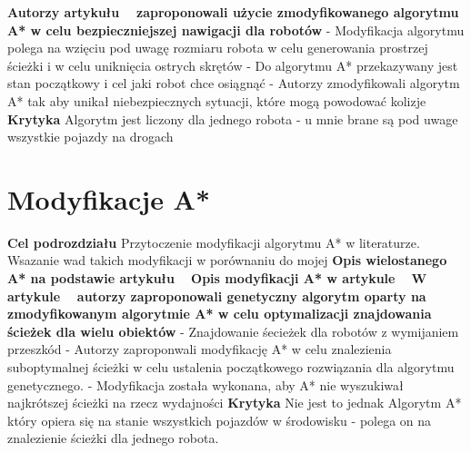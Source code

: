 \newline
\newline
\textbf{Autorzy artykułu ~\cite{elhalawany2013modified} zaproponowali użycie zmodyfikowanego algorytmu A* w celu bezpieczniejszej nawigacji dla robotów}
  \newline
  - Modyfikacja algorytmu polega na wzięciu pod uwagę rozmiaru robota w celu generowania prostrzej ścieżki i w celu uniknięcia ostrych skrętów
  \newline
  - Do algorytmu A* przekazywany jest stan początkowy i cel jaki robot chce osiągnąć
  \newline
  - Autorzy zmodyfikowali algorytm A* tak aby unikał niebezpiecznych sytuacji, które mogą powodować kolizje
\newline
\newline
\textbf{Krytyka}
\newline
 Algorytm jest liczony dla jednego robota - u mnie brane są pod uwage wszystkie pojazdy na drogach
\section{Modyfikacje A*}

\textbf{Cel podrozdziału}
Przytoczenie modyfikacji algorytmu A* w literaturze. Wsazanie wad takich modyfikacji w porównaniu do mojej
\newline
\newline
\textbf{Opis wielostanego A* na podstawie artykułu ~\cite{wojnicki2015robust} }
\newline
\newline
\textbf{Opis modyfikacji A* w artykule ~\cite{munteanmobile}}
\newline
\newline
\textbf{W artykule ~\cite{oleiwi2014modified} autorzy zaproponowali genetyczny algorytm oparty na zmodyfikowanym algorytmie A* w celu optymalizacji znajdowania ścieżek dla wielu obiektów}
\newline
- Znajdowanie śecieżek dla robotów z wymijaniem przeszkód
\newline
- Autorzy zaproponwali modyfikację A* w celu znalezienia suboptymalnej ścieżki w celu ustalenia początkowego rozwiązania dla algorytmu genetycznego.
\newline
- Modyfikacja została wykonana, aby A* nie wyszukiwał najkrótszej ścieżki na rzecz wydajności
\newline
\newline
\textbf{Krytyka}
\newline
Nie jest to jednak Algorytm A* który opiera się na stanie wszystkich pojazdów w środowisku - polega on na znalezienie ścieżki dla jednego robota.
